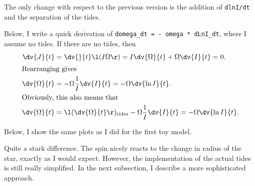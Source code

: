\documentclass[a4paper,10pt]{article}
\begin{document}
The only change with respect to the previous version is the addition of \lstinline[style=output, breaklines=true]|dlnI/dt| and the separation of the tides.

Below, I write a quick derivation of \lstinline[style=output, breaklines=true]|domega_dt = - omega * dLnI_dt|, where I assume no tides. If there are no tides, then
\begin{align*}
    \dv{J}{t} &= \dv{}{t}\l(I \Omega \r) = I \dv{\Omega }{t} + \Omega \dv{I}{t} = 0.\\
    \intertext{Rearranging gives}
    \dv{\Omega }{t} &= -\Omega \frac{1}{I}\dv{I}{t} = -\Omega \dv{\ln I}{t}. \\
    \intertext{Obviously, this also means that}
    \dv{\Omega }{t} &= \l(\dv{\Omega }{t}\r) _\text{tides} -\Omega \frac{1}{I}\dv{I}{t} = -\Omega \dv{\ln I}{t}.
\end{align*}

Below, I show the same plots as I did for the first toy model.

\begin{figure}[ht]
    \centering
\end{figure}

\begin{figure}[ht]
    \centering
\end{figure}

Quite a stark difference. The spin nicely reacts to the change in radius of the star, exactly as I would expect. However, the implementation of the actual tides is still really simplified. In the next subsection, I describe a more sophisticated approach.

\end{document}
